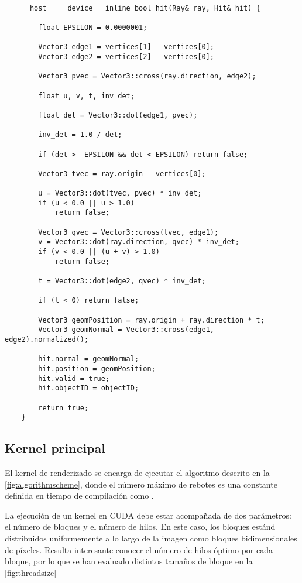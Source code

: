 \begin{lstlisting}
	
	__host__ __device__ inline bool hit(Ray& ray, Hit& hit) {

		float EPSILON = 0.0000001;

        Vector3 edge1 = vertices[1] - vertices[0];
        Vector3 edge2 = vertices[2] - vertices[0];

        Vector3 pvec = Vector3::cross(ray.direction, edge2);

        float u, v, t, inv_det;

        float det = Vector3::dot(edge1, pvec);

        inv_det = 1.0 / det;

        if (det > -EPSILON && det < EPSILON) return false;

        Vector3 tvec = ray.origin - vertices[0];

        u = Vector3::dot(tvec, pvec) * inv_det;
        if (u < 0.0 || u > 1.0)
            return false;

        Vector3 qvec = Vector3::cross(tvec, edge1);
        v = Vector3::dot(ray.direction, qvec) * inv_det;
        if (v < 0.0 || (u + v) > 1.0)
            return false;

        t = Vector3::dot(edge2, qvec) * inv_det;

        if (t < 0) return false;

        Vector3 geomPosition = ray.origin + ray.direction * t;
		Vector3 geomNormal = Vector3::cross(edge1, edge2).normalized();
		
		hit.normal = geomNormal;
		hit.position = geomPosition;
		hit.valid = true;
		hit.objectID = objectID;

        return true;
	}

\end{lstlisting}

\subsection{Kernel principal}
	
El kernel de renderizado  se encarga de ejecutar el algoritmo descrito en la \autoref{fig:algorithmscheme}, donde el número máximo de rebotes es una constante definida en tiempo de compilación como .

La ejecución de un kernel en CUDA debe estar acompañada de dos parámetros: el número de bloques y el número de hilos. En este caso, los bloques estánd distribuidos uniformemente a lo largo de la imagen como bloques bidimensionales de  píxeles. Resulta interesante conocer el número de hilos óptimo por cada bloque, por lo que se han evaluado distintos tamaños de bloque en la \autoref{fig:threadsize}

